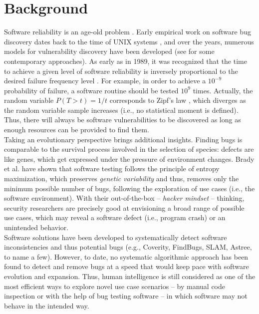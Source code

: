 \section{Background}
\label{sec:related}

Software reliability is an age-old problem \cite{littlewood1973bayesian,adams1984textordfeminineoptimizing,littlewood1989predicting}. Early empirical work on software bug discovery dates back to the time of UNIX systems \cite{miller1990empirical}, and over the years, numerous models for vulnerability discovery have been developed (see \cite{avgerinos2014enhancing,zhao2016empirical} for some contemporary approaches). As early as in 1989, it was recognized that the time to achieve a given level of software reliability is inversely proportional to the desired failure frequency level \cite{adams1984textordfeminineoptimizing}. For example, in order to achieve a $10^{-9}$ probability of failure, a software routine should be tested $10^{9}$ times. Actually, the random variable $P(T > t) = 1/t$ corresponds to Zipf's law \cite{maillart2008empirical,saichev2009theory}, which diverges as the random variable sample increases (i.e., no statistical moment is defined). Thus, there will always be software vulnerabilities to be discovered as long as enough resources can be provided to find them.\\

Taking an evolutionary perspective brings additional insights. Finding bugs is comparable to the survival process involved in the selection of species: defects are like genes, which get expressed under the pressure of environment changes. Brady et al. \cite{brady1999murphy} have shown that software testing follows the principle of entropy maximization, which preserves {\it genetic variability} and thus, removes only the minimum possible number of bugs, following the exploration of use cases (i.e., the software environment). With their out-of-the-box -- {\it hacker mindset} -- thinking, security researchers are precisely good at envisioning a broad range of possible use cases, which may reveal a software defect (i.e., program crash) or an unintended behavior.\\

Software solutions have been developed to systematically detect software inconsistencies and thus potential bugs (e.g., Coverity, FindBugs, SLAM, Astree, to name a few). However, to date, no systematic algorithmic approach has been found to detect and remove bugs at a speed that would keep pace with software evolution and expansion. Thus, human intelligence is still considered as one of the most efficient ways to explore novel use case scenarios -- by manual code inspection or with the help of bug testing software -- in which software may not behave in the intended way.\\

